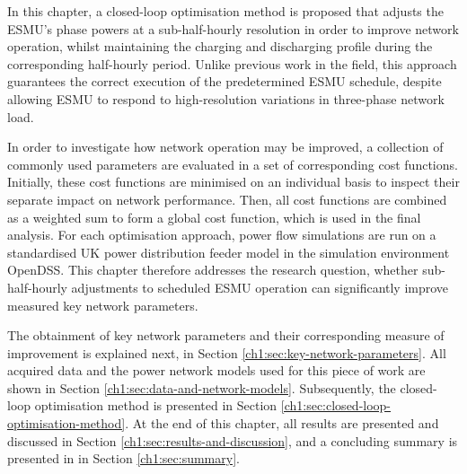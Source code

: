 In this chapter, a closed-loop optimisation method is proposed that adjusts the ESMU's phase powers at a sub-half-hourly resolution in order to improve network operation, whilst maintaining the charging and discharging profile during the corresponding half-hourly period.
Unlike previous work in the field, this approach guarantees the correct execution of the predetermined ESMU schedule, despite allowing ESMU to respond to high-resolution variations in three-phase network load.

In order to investigate how network operation may be improved, a collection of commonly used parameters are evaluated in a set of corresponding cost functions.
Initially, these cost functions are minimised on an individual basis to inspect their separate impact on network performance.
Then, all cost functions are combined as a weighted sum to form a global cost function, which is used in the final analysis.
For each optimisation approach, power flow simulations are run on a standardised UK power distribution feeder model in the simulation environment OpenDSS.
This chapter therefore addresses the research question, whether sub-half-hourly adjustments to scheduled ESMU operation can significantly improve measured key network parameters.

The obtainment of key network parameters and their corresponding measure of improvement is explained next, in Section \ref{ch1:sec:key-network-parameters}.
All acquired data and the power network models used for this piece of work are shown in Section \ref{ch1:sec:data-and-network-models}.
Subsequently, the closed-loop optimisation method is presented in Section \ref{ch1:sec:closed-loop-optimisation-method}.
At the end of this chapter, all results are presented and discussed in Section \ref{ch1:sec:results-and-discussion}, and a concluding summary is presented in in Section \ref{ch1:sec:summary}.

